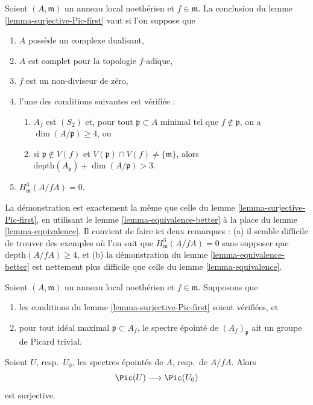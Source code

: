 \begin{remark}
\label{remark-surjective-Pic-second}
Soient $(A, \mathfrak m)$ un anneau local noethérien et $f \in \mathfrak m$.
La conclusion du lemme \ref{lemma-surjective-Pic-first} vaut si l'on suppose que
\begin{enumerate}
\item $A$ possède un complexe dualisant,
\item $A$ est complet pour la topologie $f$-adique,
\item $f$ est un non-diviseur de zéro,
\item l'une des conditions suivantes est vérifiée :
\begin{enumerate}
\item $A_f$ est $(S_2)$ et, pour tout $\mathfrak p \subset A$ minimal tel que
$f \not \in \mathfrak p$, on a $\dim(A/\mathfrak p) \geq 4$, ou
\item si $\mathfrak p \not \in V(f)$ et
$V(\mathfrak p) \cap V(f) \not = \{\mathfrak m\}$, alors
$\text{depth}(A_\mathfrak p) + \dim(A/\mathfrak p) > 3$.
\end{enumerate}
\item $H^3_{\mathfrak m}(A/fA) = 0$.
\end{enumerate}
La démonstration est exactement la même que celle du
lemme \ref{lemma-surjective-Pic-first},
en utilisant le lemme \ref{lemma-equivalence-better} à la place du
lemme \ref{lemma-equivalence}.
Il convient de faire ici deux remarques : (a)
il semble difficile de trouver des exemples où l'on sait que
$H^3_{\mathfrak m}(A/fA) = 0$ sans supposer que
$\text{depth}(A/fA) \geq 4$, et
(b) la démonstration du lemme \ref{lemma-equivalence-better} est
nettement plus difficile que celle du lemme \ref{lemma-equivalence}.
\end{remark}

\begin{lemma}
\label{lemma-surjective-Pic-first-better}
Soient $(A, \mathfrak m)$ un anneau local noethérien et $f \in \mathfrak m$.
Supposons que
\begin{enumerate}
\item les conditions du lemme \ref{lemma-surjective-Pic-first} soient vérifiées, et
\item pour tout idéal maximal $\mathfrak p \subset A_f$,
le spectre épointé de $(A_f)_\mathfrak p$ ait un groupe de Picard trivial.
\end{enumerate}
Soient $U$, resp.\ $U_0$, les spectres épointés de $A$, resp.\ de $A/fA$.
Alors
$$
\Pic(U) \longrightarrow \Pic(U_0)
$$
est surjective.
\end{lemma}

